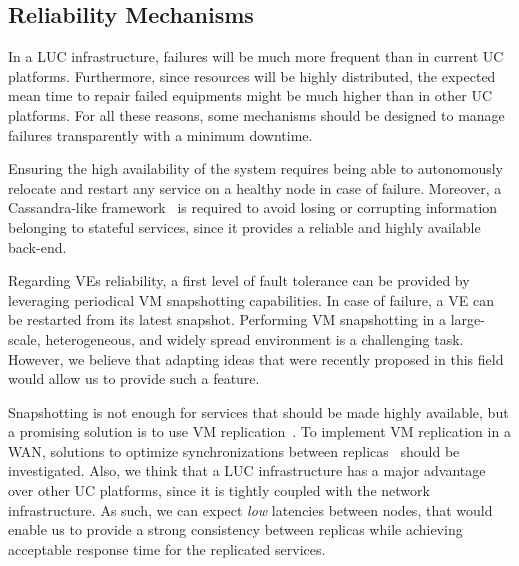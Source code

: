 \subsection{Reliability Mechanisms}
In a LUC infrastructure, failures will be much more frequent than in current UC
platforms. Furthermore, since resources will be highly distributed,
the expected mean time to repair failed equipments might be much
higher than in other UC platforms. For all these reasons, some 
mechanisms should be designed to manage failures transparently
with a minimum downtime. 


Ensuring the high availability of the \discovery system requires being able to
autonomously relocate and restart any service on a healthy node in case of failure.
Moreover, a Cassandra-like framework~\cite{lakshman:2010} is required
to avoid losing or corrupting
information belonging to stateful services, 
since it provides a reliable and highly available back-end.

Regarding VEs reliability, a first level of fault tolerance can be
provided by leveraging periodical VM snapshotting capabilities.
In case of failure, a VE can be restarted from its latest snapshot.
Performing VM snapshotting in a large-scale,
heterogeneous, and widely spread environment is a challenging
task. However, we believe that adapting ideas that were recently proposed
in this field~\cite{nicolae:2011} would allow us to provide such
a feature.

Snapshotting is not enough for services that should be made highly
available, but a promising solution is to use VM
replication~\cite{Petrovic2012}. To implement VM replication in a WAN,
solutions to optimize synchronizations between
replicas~\cite{gerofi:2012,rajagopalan:2012} should be
investigated. Also, we think that a LUC infrastructure has a major advantage over
other UC platforms, since it is tightly coupled with the network
infrastructure. As such, we can expect \emph{low} latencies between
nodes, that would enable us to provide a strong consistency between
replicas while achieving acceptable response time for the replicated
services. 


